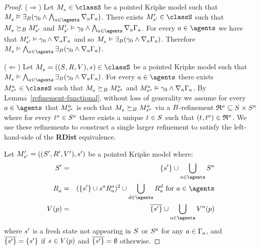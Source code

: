 \begin{proof}
($\Rightarrow$)
Let $\kPModel{\kStateS} \in \classS$ be a pointed Kripke model such that $\kPModel{\kStateS} \entails \somerefsBs (\gamma_0 \land \bigwedge_{\agentA \in \agents} \coversA \Gamma_\agentA)$.
There exists $\kPModelP{\kStateSP} \in \classS$ such that $\kPModel{\kStateS} \simulatesBs \kPModelP{\kStateSP}$ and $\kPModelP{\kStateSP} \entails \gamma_0 \land \bigwedge_{\agentA \in \agents} \coversA \Gamma_\agentA$.
For every $\agentA \in \agents$ we have that $\kPModelP{\kStateSP} \entails \gamma_0 \land \coversA \Gamma_\agentA$ and so $\kPModel{\kStateS} \entails \somerefsBs (\gamma_0 \land \coversA \Gamma_\agentA)$.
Therefore $\kPModel{\kStateS} \entails \bigwedge_{\agentA \in \agents} \somerefsBs (\gamma_0 \land \coversA \Gamma_\agentA)$.

($\Leftarrow$)
Let $\kPModelAndTuple{\kStateS} \in \classS$ be a pointed Kripke model such that $\kPModel{\kStateS} \entails \bigwedge_{\agentA \in \agents} \somerefsBs (\gamma_0 \land \coversA \Gamma_\agentA)$.
For every $\agentA \in \agents$ there exists $\kPModel[\agentA]{\kStateS[\agentA]} \in \classS$ such that $\kPModel{\kStateS} \simulatesBs \kPModel[\agentA]{\kStateS[\agentA]}$ and $\kPModel[\agentA]{\kStateS[\agentA]} \entails \gamma_0 \land \coversA \Gamma_\agentA$.
By Lemma~\ref{refinement-functional}, without loss of generality we assume for every $\agentA \in \agents$ that $\kPModel[\agentA]{\kStateS[\agentA]}$ is such that $\kPModel{\kStateS} \simulatesBs \kPModel[\agentA]{\kStateS[\agentA]}$ via a $\agentsB$-refinement $\refinement^{\agentA} \subseteq \kStates \times \kStates[\agentA]$ where for every $\kStateT[\agentA] \in \kStates[\agentA]$ there exists a unique $\kStateT \in \kStates$ such that $(\kStateT, \kStateT[\agentA]) \in \refinement^{\agentA}$.
We use these refinements to construct a single larger refinement to satisfy the left-hand-side of the {\bf RDist} equivalence.

Let $\kPModelAndTupleP{\kStateSP}$ be a pointed Kripke model where:
\begin{eqnarray*}
    \kStatesP &=& \{\kStateSP\} \cup \bigcup_{\agentA \in \agents} \kStates[\agentA]\\
    \kAccessibilityA &=& (\{\kStateSP\} \cup \kSuccessorsA[\agentA]{\kStateS[\agentA]})^2 \cup \bigcup_{\agentD \in \agents} \kAccessibilityA[\agentD] \text{ for } \agentA \in \agents\\
    \kValuation(\atomP) &=& \overline{\{\kStateSP\}} \cup \bigcup_{\agentA \in \agents} \kValuation[\agentA](\atomP)
\end{eqnarray*}
where $\kStateSP$ is a fresh state not appearing in $\kStates$ or $\kStates[\agentA]$ for any $\agentA \in \Gamma_\agentA$, and $\overline{\{\kStateSP\}} = \{\kStateSP\}$ if $\kStateS \in \kValuation(\atomP)$ and $\overline{\{\kStateSP\}} = \emptyset$ otherwise.


\end{proof}
